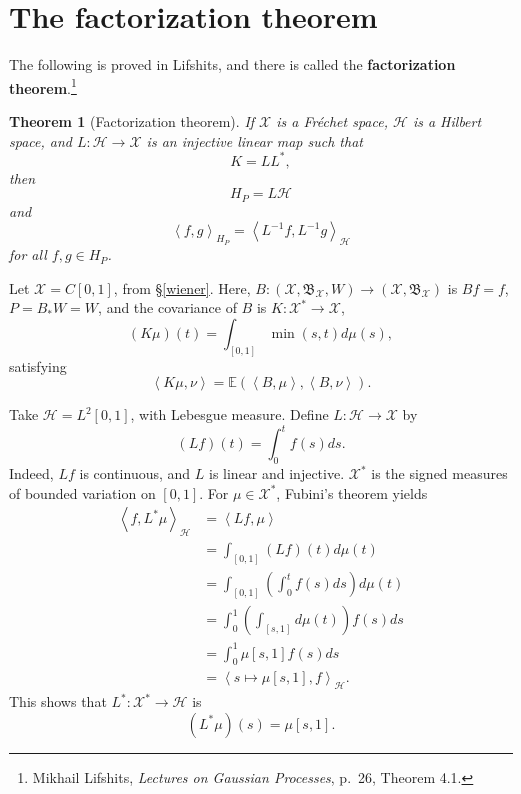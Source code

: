 \documentclass{article}
\newcommand{\inner}[2]{\left\langle #1, #2 \right\rangle}
\newtheorem{theorem}{Theorem}
\theoremstyle{definition}
\begin{document}
\section{The factorization theorem}
The following is proved in Lifshits, and there is called the \textbf{factorization theorem}.\footnote{Mikhail Lifshits, {\em Lectures on Gaussian Processes},
p.~26, Theorem 4.1.}

\begin{theorem}[Factorization theorem]
If $\mathscr{X}$ is a Fr\'echet space, $\mathscr{H}$ is a Hilbert space, and
$L:\mathscr{H} \to \mathscr{X}$ is an injective linear map
such that
\[
K = LL^*,
\]
then
\[
H_P = L \mathscr{H}
\]
and
\[
\inner{f}{g}_{H_P} = \inner{L^{-1}f}{L^{-1}g}_{\mathscr{H}}
\]
for all $f,g \in H_P$.
\label{factorization}
\end{theorem}


Let $\mathscr{X}=C[0,1]$, from \S \ref{wiener}. Here,
$B:(\mathscr{X},\mathfrak{B}_{\mathscr{X}},W) \to (\mathscr{X},\mathfrak{B}_{\mathscr{X}})$
is $Bf=f$,  $P=B_* W = W$, and the covariance of $B$ is
$K:\mathscr{X}^* \to \mathscr{X}$,
\[
(K\mu)(t) = \int_{[0,1]} \min(s,t) d\mu(s),
\]
 satisfying
\[
\inner{K\mu}{\nu} = \mathbb{E}(\inner{B}{\mu},\inner{B}{\nu}).
\]


Take $\mathscr{H}=L^2[0,1]$, with Lebesgue measure. 
Define $L:\mathscr{H} \to \mathscr{X}$ by
\[
(L f)(t) = \int_0^t f(s) ds.
\]
Indeed, $Lf$ is continuous, and $L$ is linear and injective. 
$\mathscr{X}^*$ is the signed measures of bounded variation on $[0,1]$.
For $\mu \in \mathscr{X}^*$,  Fubini's theorem yields
\begin{align*}
 \inner{f}{L^*\mu}_{\mathscr{H}}& =
\inner{Lf}{\mu}\\
&=
\int_{[0,1]} (Lf)(t) d\mu(t)\\
&=\int_{[0,1]} \left( \int_0^t f(s) ds\right) d\mu(t)\\
&=\int_0^1 \left( \int_{[s,1]} d\mu(t) \right) f(s) ds\\
&=\int_0^1 \mu[s,1] f(s) ds\\
&=\inner{s \mapsto \mu[s,1]}{f}_{\mathscr{H}}.
\end{align*}
This shows that $L^*:\mathscr{X}^* \to \mathscr{H}$ is
\[
(L^*\mu)(s) = \mu[s,1].
\]
\end{document}
